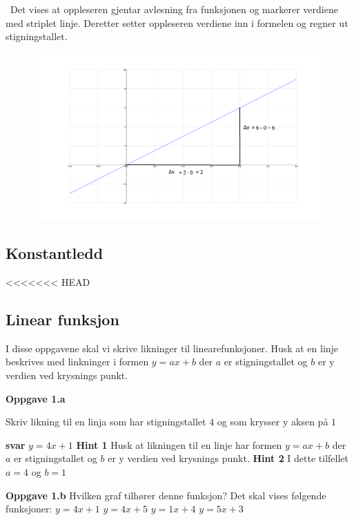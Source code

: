 \documentclass[12pt,twoside,onecolumn]{article}
\begin{document}
\begin{Exercise}
{\color{PineGreen} Det vises at oppleseren gjentar avlesning fra funksjonen og markerer verdiene med striplet linje. Deretter setter oppleseren verdiene inn i formelen og regner ut stigningstallet.}
\begin{figure}[h!]
\centering
\includegraphics[scale = 0.3]{figures/stigningstalleksempelet.png}
\end{figure}
\end{Exercise}

\newpage
\subsection*{Konstantledd}

<<<<<<< HEAD
\subsection*{Linear funksjon}
I disse oppgavene  skal vi skrive likninger til linearefunksjoner. Husk at en linje beskrives med linkninger i formen $y=ax+b$ der $a$ er stigningstallet og $b$ er y verdien ved krysnings punkt.

\textbf{Oppgave 1.a}

Skriv likning til en linja som har stigningstallet $4$ og som krysser y aksen på $1$

\textbf{svar}  
$y=4x+1$
\textbf{Hint 1}
Husk at likningen til en linje har formen $y=ax+b$ der $a$ er stigningstallet og $b$ er y verdien ved krysnings punkt.
\textbf{Hint 2}
I dette tilfellet $a=4$ og $b=1$

\textbf{Oppgave 1.b} Hvilken graf tilhører denne funksjon? 
\newline
{\color{Maroon}Det skal vises følgende funksjoner:
$y=4x+1$
\newline
$y=4x+5$
\newline
$y=1x+4$
\newline
$y=5x+3$
\newline
}
\newline\newline
\end{document}
